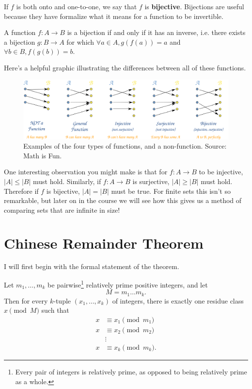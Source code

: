 \documentclass[11 pt]{scrartcl}
\begin{document}
    If $f$ is both onto and one-to-one, we say that $f$ is \textbf{bijective}. Bijections are useful because they have formalize what it means for a function to be invertible. 

\begin{theorem}
    A function $f:A\to B$ is a bijection if and only if it has an inverse, i.e. there exists a bijection $g: B\to A$ for which $\forall a\in A, g(f(a)) = a$ and $\forall b\in B, f(g(b)) = b$.
\end{theorem}

Here's a helpful graphic illustrating the differences between all of these functions. 
\begin{figure}[!htb]
    \centering
    \includegraphics[scale=0.75]{function-mapping.png}
    \caption{Examples of the four types of functions, and a non-function. Source: Math is Fun.}
\end{figure}

One interesting observation you might make is that for $f:A\to B$ to be injective, $|A| \leq |B|$ must hold. Similarly, if $f:A\to B$ is surjective, $|A| \geq |B|$ must hold. Therefore if $f$ is bijective, $|A| = |B|$ must be true. For finite sets this isn't so remarkable, but later on in the course we will see how this gives us a method of comparing sets that are infinite in size! 

\section{Chinese Remainder Theorem}

I will first begin with the formal statement of the theorem. 
\begin{theorem} 
    Let $m_1, \dots, m_k$ be pairwise\footnote{Every pair of integers is relatively prime, as opposed to being relatively prime as a whole.} relatively prime positive integers, and let
    \[ M = m_1 \dots m_k.\]
    Then for every $k$-tuple $(x_1, \dots, x_k)$ of integers, there is exactly one residue class $x \pmod{M}$ such that
    \begin{align*}
        x &\equiv x_1 \pmod{m_1} \\ 
        x &\equiv x_2 \pmod{m_2} \\ 
          &\vdots  \\
        x &\equiv x_k \pmod{m_k}.
    \end{align*}
\end{theorem}
\end{document}
